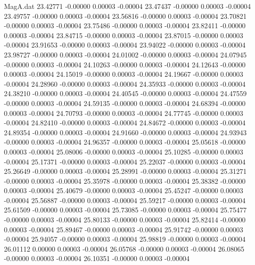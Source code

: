 \begin{filecontents}{MagA.dat}
  23.42771   -0.00000    0.00003   -0.00004
  23.47437   -0.00000    0.00003   -0.00004
  23.49757   -0.00000    0.00003   -0.00004
  23.56816   -0.00000    0.00003   -0.00004
  23.70821   -0.00000    0.00003   -0.00004
  23.75486   -0.00000    0.00003   -0.00004
  23.82411   -0.00000    0.00003   -0.00004
  23.84715   -0.00000    0.00003   -0.00004
  23.87015   -0.00000    0.00003   -0.00004
  23.91653   -0.00000    0.00003   -0.00004
  23.94022   -0.00000    0.00003   -0.00004
  23.98727   -0.00000    0.00003   -0.00004
  24.01002   -0.00000    0.00003   -0.00004
  24.07945   -0.00000    0.00003   -0.00004
  24.10263   -0.00000    0.00003   -0.00004
  24.12643   -0.00000    0.00003   -0.00004
  24.15019   -0.00000    0.00003   -0.00004
  24.19667   -0.00000    0.00003   -0.00004
  24.28960   -0.00000    0.00003   -0.00004
  24.35933   -0.00000    0.00003   -0.00004
  24.38210   -0.00000    0.00003   -0.00004
  24.40545   -0.00000    0.00003   -0.00004
  24.47559   -0.00000    0.00003   -0.00004
  24.59135   -0.00000    0.00003   -0.00004
  24.68394   -0.00000    0.00003   -0.00004
  24.70793   -0.00000    0.00003   -0.00004
  24.77745   -0.00000    0.00003   -0.00004
  24.82410   -0.00000    0.00003   -0.00004
  24.84672   -0.00000    0.00003   -0.00004
  24.89354   -0.00000    0.00003   -0.00004
  24.91660   -0.00000    0.00003   -0.00004
  24.93943   -0.00000    0.00003   -0.00004
  24.96357   -0.00000    0.00003   -0.00004
  25.05618   -0.00000    0.00003   -0.00004
  25.08006   -0.00000    0.00003   -0.00004
  25.10285   -0.00000    0.00003   -0.00004
  25.17371   -0.00000    0.00003   -0.00004
  25.22037   -0.00000    0.00003   -0.00004
  25.26649   -0.00000    0.00003   -0.00004
  25.28991   -0.00000    0.00003   -0.00004
  25.31271   -0.00000    0.00003   -0.00004
  25.35978   -0.00000    0.00003   -0.00004
  25.38382   -0.00000    0.00003   -0.00004
  25.40679   -0.00000    0.00003   -0.00004
  25.45247   -0.00000    0.00003   -0.00004
  25.56887   -0.00000    0.00003   -0.00004
  25.59217   -0.00000    0.00003   -0.00004
  25.61509   -0.00000    0.00003   -0.00004
  25.73085   -0.00000    0.00003   -0.00004
  25.75477   -0.00000    0.00003   -0.00004
  25.80133   -0.00000    0.00003   -0.00004
  25.82414   -0.00000    0.00003   -0.00004
  25.89467   -0.00000    0.00003   -0.00004
  25.91742   -0.00000    0.00003   -0.00004
  25.94057   -0.00000    0.00003   -0.00004
  25.98819   -0.00000    0.00003   -0.00004
  26.01112    0.00000    0.00003   -0.00004
  26.05768   -0.00000    0.00003   -0.00004
  26.08065   -0.00000    0.00003   -0.00004
  26.10351   -0.00000    0.00003   -0.00004

\end{filecontents}
